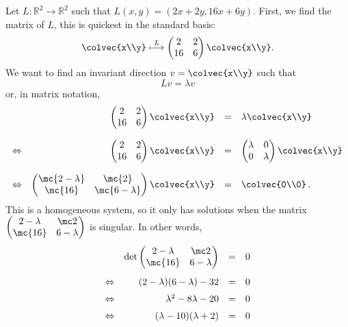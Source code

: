 
\begin{example}
Let $L \colon \mathbb{R}^2\rightarrow \mathbb{R}^2$ such that $L(x,y)=(2x+2y, 16x+6y)$.  First, we  find the matrix of $L$, this is quickest in the standard basis:
\[
\colvec{x\\y}\stackrel{L}{\longmapsto} \begin{pmatrix}
2 & 2 \\
16 & 6
\end{pmatrix}\colvec{x\\y}.
\]
We want to find an invariant direction $v=\colvec{x\\y}$ such that
\[
Lv=\lambda v
\]
or, in matrix notation,
\begin{equation*}
\begin{array}{lrcl}
&\begin{pmatrix}
2 & 2 \\
16 & 6
\end{pmatrix}\colvec{x\\y}&=&\lambda \colvec{x\\y} \\[6mm]
\Leftrightarrow &\begin{pmatrix}
2 & 2 \\
16 & 6
\end{pmatrix}\colvec{x\\y}&=&\begin{pmatrix}
\lambda & 0 \\
0 & \lambda
\end{pmatrix} \colvec{x\\y} \\[6mm] 
\Leftrightarrow& 
\begin{pmatrix}
\mc{2-\lambda} & \mc{2} \\
\mc{16} & \mc{6-\lambda}
\end{pmatrix}\colvec{x\\y}&=& \colvec{0\\0}\, .
\end{array}
\end{equation*}
This is a homogeneous system, so it only has solutions when the matrix $\begin{pmatrix}
2-\lambda & \mc2 \\
\mc{16} & 6-\lambda
\end{pmatrix}$ is singular.  In other words, 
\begin{equation*}
\begin{array}{lrcl}
&\det \begin{pmatrix}
2-\lambda & \mc2 \\
\mc{16} & 6-\lambda
\end{pmatrix}&=&0 \\[5mm]
\Leftrightarrow& (2-\lambda)(6-\lambda)-32&=&0 \\[2mm]
\Leftrightarrow &\lambda^2-8\lambda-20&=&0\\[2mm]
\Leftrightarrow &(\lambda-10)(\lambda+2)&=&0
\end{array}
\end{equation*}


\end{example}
